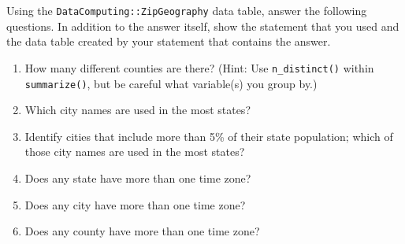 \documentclass[
  letterpaper,
  DIV=11,
  numbers=noendperiod,
  oneside]{scrartcl}
\providecommand{\tightlist}{%
  \setlength{\itemsep}{0pt}\setlength{\parskip}{0pt}}\usepackage{longtable,booktabs,array}
\begin{document}
\begin{tcolorbox}[enhanced jigsaw, colbacktitle=quarto-callout-note-color!10!white, opacityback=0, breakable, opacitybacktitle=0.6, colback=white, coltitle=black, arc=.35mm, title=\textcolor{quarto-callout-note-color}{\faInfo}\hspace{0.5em}{Exercise 5.35 doe-dream-room}, left=2mm, colframe=quarto-callout-note-color-frame, rightrule=.15mm, bottomrule=.15mm, leftrule=.75mm, bottomtitle=1mm, toptitle=1mm, titlerule=0mm, toprule=.15mm]

Using the \texttt{DataComputing::ZipGeography} data table, answer the
following questions. In addition to the answer itself, show the
statement that you used and the data table created by your statement
that contains the answer.

\begin{enumerate}
\def\labelenumi{\arabic{enumi}.}
\tightlist
\item
  How many different counties are there? (Hint: Use
  \texttt{n\_distinct()} within \texttt{summarize()}, but be careful
  what variable(s) you group by.)
\item
  Which city names are used in the most states?
\item
  Identify cities that include more than 5\% of their state population;
  which of those city names are used in the most states?
\item
  Does any state have more than one time zone?
\item
  Does any city have more than one time zone?
\item
  Does any county have more than one time zone?
\end{enumerate}

\end{tcolorbox}
\end{document}
